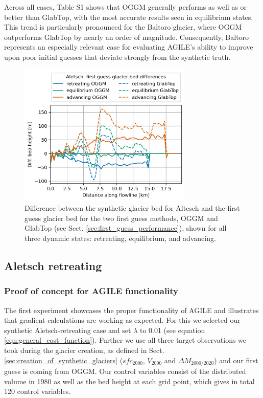\documentclass[journal abbreviation, manuscript]{copernicus}
\begin{document}
Across all cases, Table S1 shows that OGGM generally performs as well as or better than GlabTop, with the most accurate results seen in equilibrium states. This trend is particularly pronounced for the Baltoro glacier, where OGGM outperforms GlabTop by nearly an order of magnitude. Consequently, Baltoro represents an especially relevant case for evaluating AGILE’s ability to improve upon poor initial guesses that deviate strongly from the synthetic truth.

\begin{figure}
    \centering
    \includegraphics[width=8.3cm]{fig03.png}
    \caption{Difference between the synthetic glacier bed for Altesch and the first guess glacier bed for the two first guess methods, OGGM and GlabTop (see Sect. \ref{sec:first_guess_performance}), shown for all three dynamic states: retreating, equilibrium, and advancing.}
    \label{fig:aletsch_fg_bed}
\end{figure}


\subsection{Aletsch retreating}
\label{sec:aletsch_retreating}

\subsubsection{Proof of concept for AGILE functionality}
\label{subsec:prove of concept}

The first experiment showcases the proper functionality of AGILE and illustrates that gradient calculations are working as expected. For this we selected our synthetic Aletsch-retreating case and set $\lambda$ to 0.01 (see equation \ref{eqn:general_cost_function}). Further we use all three target observations we took during the glacier creation, as defined in Sect. \ref{sec:creation_of_synthetic_glaciers} ($sfc_{2000}$, $V_{2000}$ and $\Delta M_{2000/2020}$) and our first guess is coming from OGGM. Our control variables consist of the distributed volume in 1980 as well as the bed height at each grid point, which gives in total 120 control variables.
\end{document}
